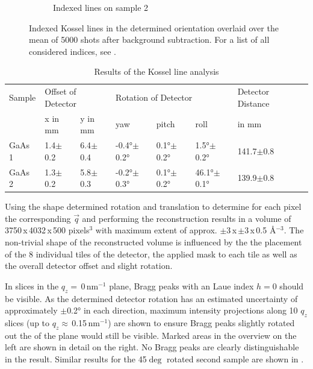 \begin{figure}
\begin{subfigure}{0.35\textwidth}
		\caption{Indexed lines on sample 2}
	\end{subfigure}
	\caption[Kossel lines on GaAs samples]{Indexed Kossel lines in the determined orientation overlaid over the mean of 5000 shots after background subtraction. For a list of all considered indices, see  .}
	\label{fig:kosselgaaslines}
\end{figure}

\begin{table}[]
	\caption{Results of the Kossel line analysis}
	\begin{small}
		\begin{tabular}{llllllll}
			\hline
			Sample & \multicolumn{2}{l}{Offset of Detector} & \multicolumn{3}{l}{Rotation of Detector}  & Detector Distance &  \\
			& x in mm        & y in mm        & yaw              & pitch           & roll           & in mm             &  \\ 
			\hline
			GaAs 1 & 1.4$\pm$0.2    & 6.4$\pm$0.4    & -0.4°$\pm$0.2° & 0.1°$\pm$0.2° & 1.5°$\pm$0.2° & 141.7$\pm$0.8     &  \\
			GaAs 2 & 1.3$\pm$0.2    & 5.8$\pm$0.3    & -0.2°$\pm$0.3° & 0.1°$\pm$0.2° & 46.1°$\pm$0.1° & 139.9$\pm$0.8     &  \\
			\hline
		\end{tabular}
	\end{small}	
	\label{tab:kosselfit}
\end{table}

Using the shape determined rotation and translation to determine for each pixel the corresponding $\vec{q}$ and performing the reconstruction results in a volume of 3750\,x\,4032\,x\,500 pixels$^3$ with maximum extent of approx. $\pm$3\,x\,$\pm$3\,x\,0.5 \AA$^{-3}$.
 The non-trivial shape of the reconstructed volume is influenced by the the placement of the 8 individual tiles of the detector, the applied mask to each tile as well as the overall detector offset and slight rotation.

 In slices in the $q_z=$\,0\,nm$^{-1}$ plane, Bragg peaks with an Laue index $h=0$ should be visible. As the determined detector rotation has an estimated uncertainty of approximately $\pm$0.2° in each direction, maximum intensity projections along 10 $q_z$ slices (up to $q_z\approx$\,0.15\,nm$^{-1}$) are shown to ensure Bragg peaks slightly rotated out the of the plane would still be visible. Marked areas in the overview on the left are shown in detail on the right.  No Bragg peaks are clearly distinguishable in the result. Similar results for the 45$\deg$ rotated second sample are shown in .
 

